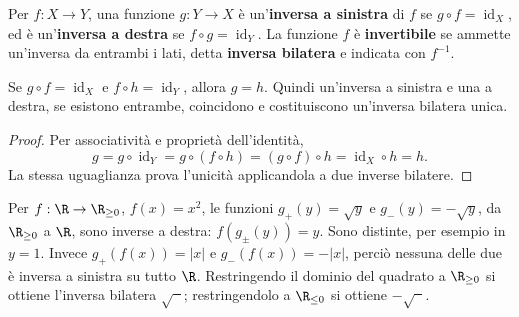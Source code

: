 \begin{definizione}
Per $f:X\to Y$, una funzione $g:Y\to X$ è un'\textbf{inversa a sinistra} di $f$ se $g\circ f=\operatorname{id}_X$, ed è un'\textbf{inversa a destra} se $f\circ g=\operatorname{id}_Y$. La funzione $f$ è \textbf{invertibile} se ammette un'inversa da entrambi i lati, detta \textbf{inversa bilatera} e indicata con $f^{-1}$.
\end{definizione}

\begin{proposizione}
Se $g\circ f=\operatorname{id}_X$ e $f\circ h=\operatorname{id}_Y$, allora $g=h$. Quindi un'inversa a sinistra e una a destra, se esistono entrambe, coincidono e costituiscono un'inversa bilatera unica.
\end{proposizione}
\begin{proof}
Per associatività e proprietà dell'identità,
\[
g=g\circ\operatorname{id}_Y=g\circ(f\circ h)
=(g\circ f)\circ h=\operatorname{id}_X\circ h=h.
\]
La stessa uguaglianza prova l'unicità applicandola a due inverse bilatere.
\end{proof}

\begin{esempio}
Per $f:\R\to\R_{\ge0}$, $f(x)=x^2$, le funzioni $g_+(y)=\sqrt y$ e $g_-(y)=-\sqrt y$, da $\R_{\ge0}$ a $\R$, sono inverse a destra: $f(g_\pm(y))=y$. Sono distinte, per esempio in $y=1$. Invece $g_+(f(x))=|x|$ e $g_-(f(x))=-|x|$, perciò nessuna delle due è inversa a sinistra su tutto $\R$. Restringendo il dominio del quadrato a $\R_{\ge0}$ si ottiene l'inversa bilatera $\sqrt{\phantom{x}}$; restringendolo a $\R_{\le0}$ si ottiene $-\sqrt{\phantom{x}}$.
\end{esempio}

